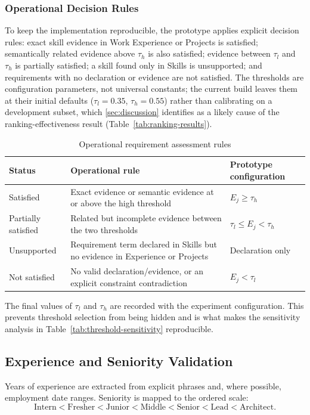 \documentclass[12pt,a4paper,oneside]{report}
\begin{document}
\subsubsection{Operational Decision Rules}
To keep the implementation reproducible, the prototype applies explicit decision rules: exact skill evidence in Work Experience or Projects is satisfied; semantically related evidence above $\tau_h$ is also satisfied; evidence between $\tau_l$ and $\tau_h$ is partially satisfied; a skill found only in Skills is unsupported; and requirements with no declaration or evidence are not satisfied. The thresholds are configuration parameters, not universal constants; the current build leaves them at their initial defaults ($\tau_l{=}0.35$, $\tau_h{=}0.55$) rather than calibrating on a development subset, which \cref{sec:discussion} identifies as a likely cause of the ranking-effectiveness result (Table~\ref{tab:ranking-results}).

\begin{table}[htbp]
\centering
\caption{Operational requirement assessment rules}
\label{tab:assessment-rules}
\begin{tabularx}{\textwidth}{p{}Xp{}}
\toprule
Status & Operational rule & Prototype configuration \\
\midrule
Satisfied & Exact evidence or semantic evidence at or above the high threshold & $E_j \geq \tau_h$ \\
Partially satisfied & Related but incomplete evidence between the two thresholds & $\tau_l \leq E_j < \tau_h$ \\
Unsupported & Requirement term declared in Skills but no evidence in Experience or Projects & Declaration only \\
Not satisfied & No valid declaration/evidence, or an explicit constraint contradiction & $E_j < \tau_l$ \\
\bottomrule
\end{tabularx}
\end{table}

The final values of $\tau_l$ and $\tau_h$ are recorded with the experiment configuration. This prevents threshold selection from being hidden and is what makes the sensitivity analysis in Table~\ref{tab:threshold-sensitivity} reproducible.

\subsection{Experience and Seniority Validation}
Years of experience are extracted from explicit phrases and, where possible, employment date ranges. Seniority is mapped to the ordered scale:
\begin{equation}
\text{Intern} < \text{Fresher} < \text{Junior} < \text{Middle} < \text{Senior} < \text{Lead} < \text{Architect}.
\end{equation}
\end{document}
